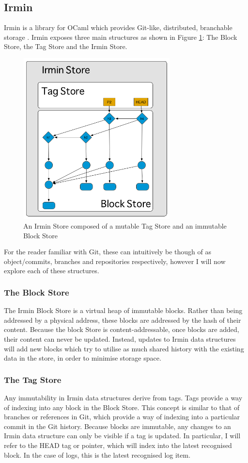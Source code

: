 \documentclass[12pt,a4paper,twoside,openright]{report}
\begin{document}
	\subsection{Irmin}
		Irmin is a library for OCaml which provides Git-like, distributed, branchable storage \cite{Irmin}. 
		Irmin exposes three main structures as shown in Figure \ref{fig:IrminBlockStore}: The Block Store, the Tag Store and the Irmin Store.
		\begin{figure}
			\begin{center}
			\includegraphics[width=8cm]{figs/irmin-stores.png}
			\caption{An Irmin Store composed of a mutable Tag Store and an immutable Block Store}
			\label{fig:IrminBlockStore}
			\end{center}
		\end{figure}
		For the reader familiar with Git, these can intuitively be though of as object/commits, branches and repositories respectively, however I will now explore each of these structures.
		\subsubsection*{The Block Store}
		The Irmin Block Store is a virtual heap of immutable blocks. 
		Rather than being addressed by a physical address, these blocks are addressed by the hash of their content.
		Because the block Store is content-addressable, once blocks are added, their content can never be updated.
		Instead, updates to Irmin data structures will add new blocks which try to utilise as much shared history with the existing data in the store, in order to minimise storage space.
		\subsubsection*{The Tag Store}
		Any immutability in Irmin data structures derive from tags.
		Tags provide a way of indexing into any block in the Block Store.
		This concept is similar to that of branches or references in Git, which provide a way of indexing into a particular commit in the Git history.
		Because blocks are immutable, any changes to an Irmin data structure can only be visible if a tag is updated. 
		In particular, I will refer to the HEAD tag or pointer, which will index into the latest recognised block.
		In the case of logs, this is the latest recognised log item.
\end{document}

